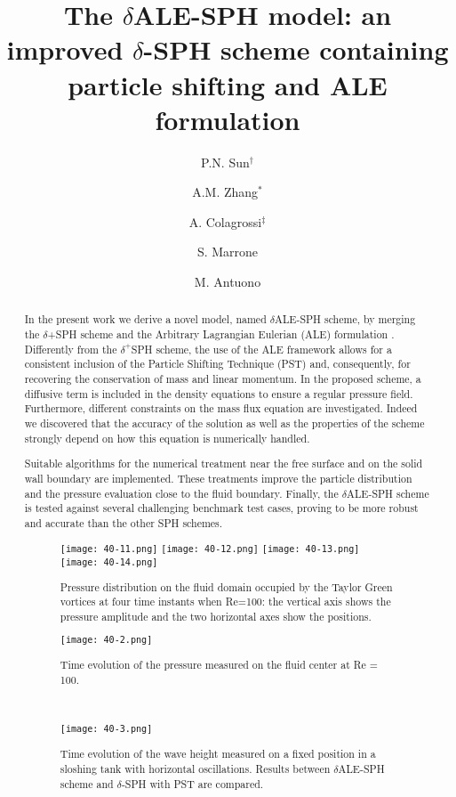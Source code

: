 \documentclass[10pt]{article}
\title{The $\delta$ALE-SPH model: an improved $\delta$-SPH scheme containing particle shifting and ALE formulation}
\date{}
\author[1]{P.N. Sun$^\dagger$}
\author[1]{A.M. Zhang$^*$}
\author[2]{A. Colagrossi$^\ddag$}
\author[2]{S. Marrone}
\author[2]{ M. Antuono}
\affil[1]{College of Shipbuilding Engineering, Harbin Engineering University, Harbin, China}
\affil[2]{CNR-INSEAN, Marine Technology Research Institute, Rome, Italy}
\affil[$\relax$]{\email{\dagger}{sunpengnan@yeah.net}, \email{*}{zhangaman@hrbeu.edu.cn}, \email{\ddag}{andrea.colagrossi@cnr.it}}
\begin{document}
\maketitle


\begin{abstract}
 In the present work we derive a novel model, named $\delta$ALE-SPH scheme, by merging the $\delta$+SPH scheme \cite{sun2017deltaplus} and the Arbitrary Lagrangian Eulerian (ALE) formulation \cite{oger2016sph}. Differently from the $\delta^+$SPH scheme, the use of the ALE framework allows for a consistent inclusion of the Particle Shifting Technique (PST) and, consequently, for recovering the conservation of mass and linear momentum. In the proposed scheme, a diffusive term is included in the density equations to ensure a regular pressure field. Furthermore, different constraints on the mass flux equation are investigated. Indeed we discovered that the accuracy of the solution as well as the properties of the scheme strongly depend on how this equation is numerically handled.
 
Suitable algorithms for the numerical treatment near the free surface and on the solid wall boundary are implemented. These treatments improve the particle distribution and the pressure evaluation close to the fluid boundary. Finally, the $\delta$ALE-SPH scheme is tested against several challenging benchmark test cases, proving to be more robust and accurate than the other SPH schemes. 

\begin{figure}[!htb]
\centering
\texttt{[image: 40-11.png]}
\texttt{[image: 40-12.png]}
\texttt{[image: 40-13.png]}
\texttt{[image: 40-14.png]}
\caption{Pressure distribution on the fluid domain occupied by the Taylor Green vortices at four time instants when Re=100: the vertical axis shows the pressure amplitude and the two horizontal axes show the positions.}\label{fig:40-1}
\end{figure}

\begin{figure}[!htb]
\begin{minipage}[t]{0.3\linewidth}
\centering
\texttt{[image: 40-2.png]}
\caption{Time evolution of the pressure measured on the fluid center at Re = 100.}\label{fig:40-2}
\end{minipage}
\begin{minipage}[t]{0.05\linewidth}
~~
\end{minipage}
\begin{minipage}[t]{0.62\linewidth}
\centering
\texttt{[image: 40-3.png]}
\caption{Time evolution of the wave height measured on a fixed position in a sloshing tank with horizontal oscillations. Results between $\delta$ALE-SPH scheme and $\delta$-SPH with PST are compared.}\label{fig:40-3}
\end{minipage}
\end{figure}


\end{abstract}
\end{document}
